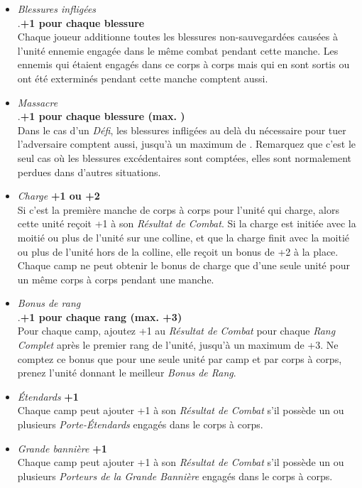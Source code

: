 \begin{multicols}{2}
\begin{itemize}[label={-}]
\item \emph{Blessures infligées} \\ .\dotfill \textbf{+1 pour chaque blessure} \\
Chaque joueur additionne toutes les blessures non-sauvegardées causées à l'unité ennemie engagée dans le même combat pendant cette manche. Les ennemis qui étaient engagés dans ce corps à corps mais qui en sont sortis ou ont été exterminés pendant cette manche comptent aussi.
\bigskip
\bigskip
\item \emph{Massacre} \\ .\dotfill \textbf{+1 pour chaque blessure (max. )} \\
Dans le cas d'un \emph{Défi}, les blessures infligées au delà du nécessaire pour tuer l'adversaire comptent aussi, jusqu'à un maximum de . Remarquez que c'est le seul cas où les blessures excédentaires sont comptées, elles sont normalement perdues dans d'autres situations.
\bigskip
\item \emph{Charge} \dotfill \textbf{+1 ou +2} \\
Si c'est la première manche de corps à corps pour l'unité qui charge, alors cette unité reçoit +1 à son \emph{Résultat de Combat}. Si la charge est initiée avec la moitié ou plus de l'unité sur une colline, et que la charge finit avec la moitié ou plus de l'unité hors de la colline, elle reçoit un bonus de +2 à la place. Chaque camp ne peut obtenir le bonus de charge que d'une seule unité pour un même corps à corps pendant une manche.
\item \emph{Bonus de rang} \\ .\dotfill \textbf{+1 pour chaque rang (max. +3)} \\
Pour chaque camp, ajoutez +1 au \emph{Résultat de Combat} pour chaque \emph{Rang Complet} après le premier rang de l'unité, jusqu'à un maximum de +3. Ne comptez ce bonus que pour une seule unité par camp et par corps à corps, prenez l'unité donnant le meilleur \emph{Bonus de Rang}.
\bigskip
\item \emph{Étendards} \dotfill \textbf{+1} \\
Chaque camp peut ajouter +1 à son \emph{Résultat de Combat} s'il possède un ou plusieurs \emph{Porte-Étendards} engagés dans le corps à corps.
\item \emph{Grande bannière} \dotfill \textbf{+1} \\
Chaque camp peut ajouter +1 à son \emph{Résultat de Combat} s'il possède un ou plusieurs \emph{Porteurs de la Grande Bannière} engagés dans le corps à corps.

\end{itemize}
\end{multicols}
